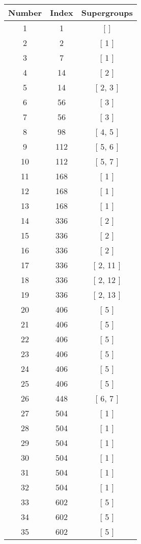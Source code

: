 \begin{center}
\begin{longtable}[H]{|| c c c ||}
\hline
Number & Index & Supergroups \\ 
\hline
1 & 1 & [  ] \\ 
\hline
2 & 2 & [ 1 ] \\ 
\hline
3 & 7 & [ 1 ] \\ 
\hline
4 & 14 & [ 2 ] \\ 
\hline
5 & 14 & [ 2, 3 ] \\ 
\hline
6 & 56 & [ 3 ] \\ 
\hline
7 & 56 & [ 3 ] \\ 
\hline
8 & 98 & [ 4, 5 ] \\ 
\hline
9 & 112 & [ 5, 6 ] \\ 
\hline
10 & 112 & [ 5, 7 ] \\ 
\hline
11 & 168 & [ 1 ] \\ 
\hline
12 & 168 & [ 1 ] \\ 
\hline
13 & 168 & [ 1 ] \\ 
\hline
14 & 336 & [ 2 ] \\ 
\hline
15 & 336 & [ 2 ] \\ 
\hline
16 & 336 & [ 2 ] \\ 
\hline
17 & 336 & [ 2, 11 ] \\ 
\hline
18 & 336 & [ 2, 12 ] \\ 
\hline
19 & 336 & [ 2, 13 ] \\ 
\hline
20 & 406 & [ 5 ] \\ 
\hline
21 & 406 & [ 5 ] \\ 
\hline
22 & 406 & [ 5 ] \\ 
\hline
23 & 406 & [ 5 ] \\ 
\hline
24 & 406 & [ 5 ] \\ 
\hline
25 & 406 & [ 5 ] \\ 
\hline
26 & 448 & [ 6, 7 ] \\ 
\hline
27 & 504 & [ 1 ] \\ 
\hline
28 & 504 & [ 1 ] \\ 
\hline
29 & 504 & [ 1 ] \\ 
\hline
30 & 504 & [ 1 ] \\ 
\hline
31 & 504 & [ 1 ] \\ 
\hline
32 & 504 & [ 1 ] \\ 
\hline
33 & 602 & [ 5 ] \\ 
\hline
34 & 602 & [ 5 ] \\ 
\hline
35 & 602 & [ 5 ] \\ 
\hline

\end{longtable}
\end{center}
